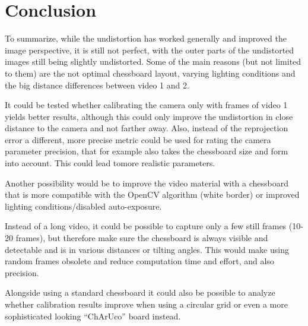\chapter{Conclusion}

To summarize, while the undistortion has worked generally and improved the image perspective, it is still not perfect, with the outer parts of the undistorted images still being slightly undistorted. Some of the main reasons (but not limited to them) are the not optimal chessboard layout, varying lighting conditions and the big distance differences between video 1 and 2.

It could be tested whether calibrating the camera only with frames of video 1 yields better results, although this could only improve the undistortion in close distance to the camera and not farther away. Also, instead of the reprojection error a different, more precise metric could be used for rating the camera parameter precision, that for example also takes the chessboard size and form into account. This could lead tomore realistic parameters.

Another possibility would be to improve the video material with a chessboard that is more compatible with the OpenCV algorithm (white border) or improved lighting conditions/disabled auto-exposure.

Instead of a long video, it could be possible to capture only a few still frames (10-20 frames), but therefore make sure the chessboard is always visible and detectable and is in various distances or tilting angles. This would make using random frames obsolete and reduce computation time and effort, and also precision.

Alongside using a standard chessboard it could also be possible to analyze whether calibration results improve when using a circular grid \cite{cv_cctut} or even a more sophisticated looking \enquote{ChArUco} board instead. \cite{cv_charuco}
